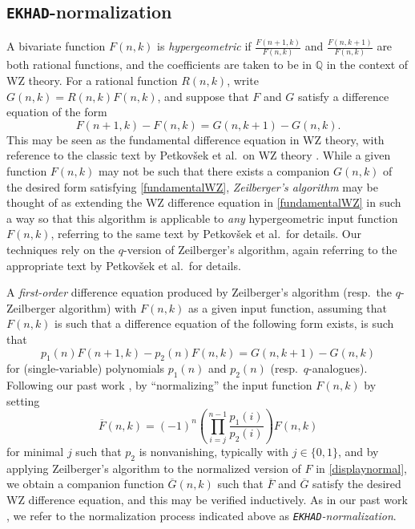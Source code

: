 \documentclass[12pt]{article}
\begin{document}
\subsection{{\tt EKHAD}-normalization}\label{sectionEKHAD}
 A bivariate function $F(n, k)$ is \emph{hypergeometric} if $\frac{F(n+1,k)}{F(n,k)}$ and $\frac{F(n,k+1)}{F(n,k)}$ are both rational functions, 
 and the coefficients are taken to be in $\mathbb{Q}$ in the context of WZ theory. For a rational function $R(n, k)$, write $G(n, k) = R(n, 
 k) F(n, k)$, and suppose that $F$ and $G$ satisfy a difference equation of the form 
\begin{equation}\label{fundamentalWZ}
 F(n+1, k) - F(n, k) = G(n, k+1) - G(n, k). 
\end{equation}
 This may be seen as the fundamental difference equation 
 in WZ theory, with reference to the classic text by 
 Petkov\v sek et al.\ on WZ theory \cite{PetkovsekWilfZeilberger1996}. 
 While a given function $F(n, k)$ may not be such that there exists a companion $G(n, k)$
 of the desired form satisfying \eqref{fundamentalWZ}, 
 \emph{Zeilberger's algorithm} \cite[\S6]{PetkovsekWilfZeilberger1996} 
 may be thought of as extending the WZ difference equation in \eqref{fundamentalWZ}
 in such a way so that this algorithm
 is applicable to \emph{any} hypergeometric input function $F(n, k)$, 
 referring to the same text by Petkov\v sek et al.\ for details. 
 Our techniques rely on the $q$-version of Zeilberger's algorithm, 
 again referring to the appropriate text by Petkov\v sek et al.\ for details. 

 A \emph{first-order} difference equation
 produced by Zeilberger's algorithm (resp.\ the $q$-Zeilberger algorithm)
 with $F(n, k)$ as a given input function, assuming that $F(n, k)$
 is such that a difference equation of the following form exists, 
 is such that 
\begin{equation}
 p_{1}(n) F(n+1, k) - p_{2}(n) F(n, k) = G(n, k+1) - G(n, k) 
\end{equation}
 for (single-variable) polynomials 
 $p_{1}(n)$ and $p_{2}(n)$ (resp.\ $q$-analogues). 
 Following our past work \cite{Campbell2026}, by ``normalizing'' 
 the input function $F(n, k)$ by setting 
\begin{equation}\label{displaynormal}
 \overline{F}(n, k) = (-1)^{n} \left( \prod_{i=j}^{n-1} \frac{p_{1}(i)}{p_{2}(i)} \right) F(n, k) 
\end{equation}
 for minimal $j$ such that $p_2$ is nonvanishing, 
 typically with $j \in \{ 0, 1 \}$, 
 and by applying Zeilberger's algorithm to the normalized version of $F$ in \eqref{displaynormal}, 
 we obtain a companion function
 $\overline{G}(n, k)$ such that $\overline{F}$ and $\overline{G}$ satisfy the desired WZ difference equation, 
 and this may be verified inductively. 
 As in our past work \cite{Campbell2026}, we refer to the normalization process indicated above
 as \emph{{\tt EKHAD}-normalization}. 
\end{document}
